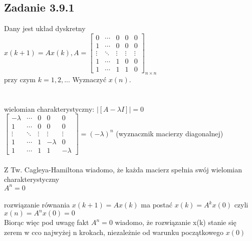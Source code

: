 \subsection*{Zadanie 3.9.1} {\color{darkgray}
	Dany jest układ dyskretny\\
	$x(k+1)=Ax(k), A=\left[ \begin{array}{ccccc}    0&\cdots&0&0&0 \\  1&\cdots&0&0&0 \\\vdots&\ddots&\vdots&\vdots&\vdots \\ 1&\cdots&1&0&0    \\1&\cdots&1&1&0\end{array}\right]_{n \times n}$\\
	przy czym $k=1,2,...$ Wyznaczyć $x(n)$.\\
}\lineh
\\\\
wielomian charakterystyczny: $| [A-\lambda I] |=0$\\
$\left[ \begin{array}{ccccc}    -\lambda&\cdots&0&0&0 \\  1&\cdots&0&0&0 \\\vdots&\ddots&\vdots&\vdots&\vdots \\ 1&\cdots&1&-\lambda&0    \\1&\cdots&1&1&-\lambda\end{array}\right]=(-\lambda)^n${\color{lightgray} (wyznacznik macierzy diagonalnej)}\\\\
Z Tw. Cagleya-Hamiltona wiadomo, że każda macierz spełnia swój wielomian charakterystyczny\\
$A^n=0 $\\\\
rozwiązanie równania $x(k+1)=Ax(k)$ ma postać $x(k)=A^kx(0)$ czyli $x(n)=A^nx(0)=0$\\
Biorąc więc pod uwagę fakt $A^n=0 $ wiadomo, że rozwiązanie x(k) stanie się zerem w cco najwyżej n krokach, niezależnie od warunku początkowego $x(0)$

\pagebreak
